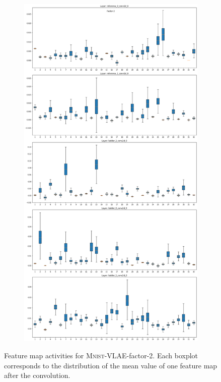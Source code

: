\begin{figure}[H]
    \centering
    \begin{subfigure}{\textwidth}
        \centering
        \includegraphics[height=.8\textheight]{images/sparseness/encoder_fm2_fms.png}
    \end{subfigure}
    \caption[\textsc{Mnist}-VLAE-factor-2: Feature Map Activites]{Feature map activities for \textsc{Mnist}-\ac{VLAE}-factor-2.
    Each boxplot corresponds to the distribution of the mean value of one feature map after the convolution.
    }
\end{figure}

